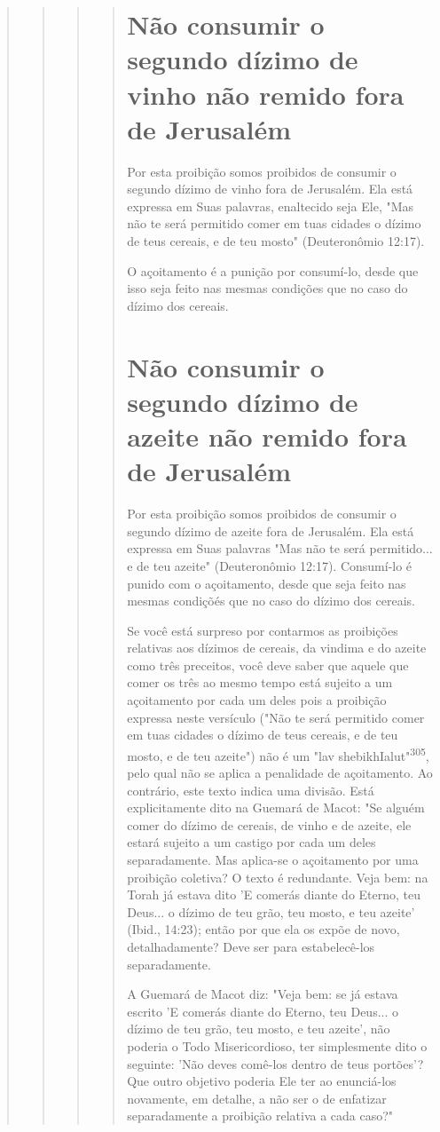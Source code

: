 \begin{quote}
\begin{quote}
\begin{quote}
\begin{quote}
\section{Não consumir o segundo dízimo de vinho não remido fora de Jerusalém}

Por esta proibição somos proibidos de consumir o segundo dízimo de vinho
fora de Jerusalém. Ela está expressa em Suas palavras, enaltecido seja
Ele, "Mas não te será permitido comer em tuas cidades o dízimo de teus
ce­reais, e de teu mosto" (Deuteronômio 12:17).

O açoitamento é a punição por consumí-lo, desde que isso seja feito nas
mesmas condições que no caso do dízimo dos cereais.

\section{Não consumir o segundo dízimo de azeite não remido fora de Jerusalém}

Por esta proibição somos proibidos de consumir o segundo dízimo de
azeite fora de Jerusalém. Ela está expressa em Suas palavras "Mas não te
será permitido... e de teu azeite" (Deuteronômio 12:17). Consumí-lo é
punido com o açoitamento, desde que seja feito nas mesmas condiçõés que
no caso do dízi­mo dos cereais.

Se você está surpreso por contarmos as proibições relativas aos dízi­mos
de cereais, da vindima e do azeite como três preceitos, você deve saber
que aquele que comer os três ao mesmo tempo está sujeito a um
açoitamento por cada um deles pois a proibição expressa neste versículo
("Não te será permi­tido comer em tuas cidades o dízimo de teus cereais,
e de teu mosto, e de teu azeite") não é um "lav
shebikhIalut"\textsuperscript{305}, pelo qual não se aplica a penalidade
de açoitamento. Ao contrário, este texto indica uma divisão. Está
explicitamente dito na Guemará de Macot: "Se alguém comer do dízimo de
cereais, de vinho e de azeite, ele estará sujeito a um castigo por cada
um deles separadamente. Mas aplica-se o açoitamento por uma proibição
coletiva? O texto é redundante. Veja bem: na Torah já estava dito 'E
comerás diante do Eterno, teu Deus... o dízimo de teu grão, teu mosto, e
teu azeite' (Ibid., 14:23); então por que ela os expõe de novo,
detalhadamente? Deve ser para estabelecê-los separadamente.

A Guemará de Macot diz: "Veja bem: se já estava escrito 'E comerás
diante do Eterno, teu Deus... o dízimo de teu grão, teu mosto, e teu
azeite', não poderia o Todo Misericordioso, ter simplesmente dito o
seguinte: 'Não de­ves comê-los dentro de teus portões'? Que outro
objetivo poderia Ele ter ao enunciá-los novamente, em detalhe, a não ser
o de enfatizar separadamente a proibição relativa a cada caso?"


\end{quote}
\end{quote}
\end{quote}
\end{quote}
